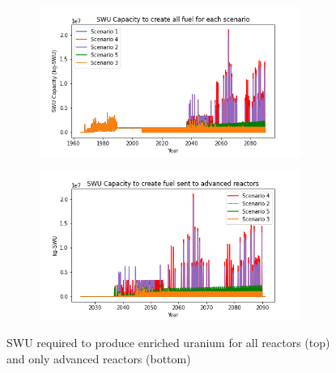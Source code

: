 \begin{frame}
\begin{columns}
\begin{itemize}
            \end{itemize}
        \column[t]{5cm}
        \vspace{-1cm}
        \begin{figure}
            \centering 
            \begin{subfigure}
                \centering
                \includegraphics[height=0.35\textheight]{figures/totalswu_scenarios_all.png}
                \label{fig:swu_all}
            \end{subfigure}
            \vspace{-0.5cm}
            \begin{subfigure}
                \centering
                \includegraphics[height=0.35\textheight]{figures/haleuSWU_scenarios_all.png}
                \label{fig:swu_haleu}
            \end{subfigure}
            \caption{\gls{SWU} required to produce enriched uranium for all 
            reactors (top) and only advanced reactors (bottom)}
            \label{fig:swu}
        \end{figure}
    \end{columns}
    

\end{frame}

